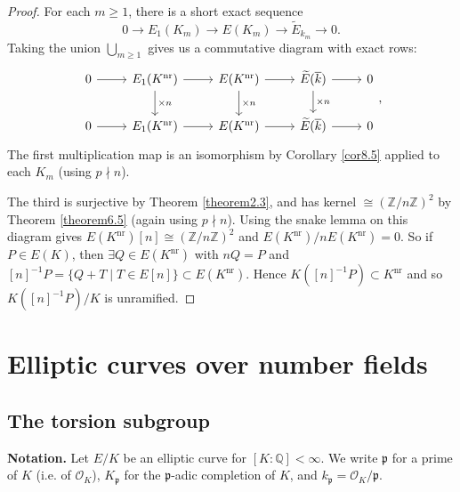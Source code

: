 \documentclass{article}
\theoremstyle{definition}
\begin{document}
\begin{proof}
    For each $m\ge 1$, there is a short exact sequence $$0 \to E_1(K_m) \to E(K_m) \to \widetilde{E}_{k_m} \to 0.$$
    Taking the union $\bigcup_{m\ge 1} $ gives us a commutative diagram with exact rows:
    $$\begin{tikzcd}[]
        0 & E_1(K^{\text{nr}}) & E(K^{\text{nr}}) & \widetilde{E}(\overline{k}) & 0 \\
        0 & E_1(K^{\text{nr}}) & E(K^{\text{nr}}) & \widetilde{E}(\overline{k}) & 0
        \arrow["", from=1-1, to=1-2]
        \arrow["", from=1-2, to=1-3]
        \arrow["", from=1-3, to=1-4]
        \arrow["", from=1-4, to=1-5]
        \arrow["", from=2-1, to=2-2]
        \arrow["", from=2-2, to=2-3]
        \arrow["", from=2-3, to=2-4]
        \arrow["", from=2-4, to=2-5]
        \arrow["\times n", from=1-2, to=2-2]
        \arrow["\times n", from=1-3, to=2-3]
        \arrow["\times n", from=1-4, to=2-4]
    \end{tikzcd},$$
    The first multiplication map is an isomorphism by Corollary \ref{cor8.5} applied to each $K_m$ (using $p \nmid n$). 
    \vspace{1mm}
    
    The third is surjective by Theorem \ref{theorem2.3}, and has kernel $\cong (\mathbb{Z}/n\mathbb{Z})^2$ by Theorem \ref{theorem6.5} (again using $p \nmid n$). Using the snake lemma on this diagram gives $E(K^{\text{nr}})[n] \cong(\mathbb{Z}/n\mathbb{Z})^2$ and $E(K^{\text{nr}})/nE(K^{\text{nr}}) = 0$. So if $P \in E(K)$, then $\exists Q \in E(K^{\text{nr}})$ with $nQ=P$ and $[n]^{-1}P = \{Q+T \mid T \in E[n]\} \subset E(K^{\text{nr}})$. Hence $K([n]^{-1}P) \subset K^{\text{nr}}$ and so $K([n]^{-1}P)/K$ is unramified.
\end{proof}
\section{Elliptic curves over number fields}
\subsection{The torsion subgroup} 
\textbf{Notation.} Let $E/K$ be an elliptic curve for $[K:\mathbb{Q}]<\infty$. We write $\mathfrak{p}$ for a prime of $K$ (i.e. of $\mathcal{O}_K$), $K_{\mathfrak{p}}$ for the $\mathfrak{p}$-adic completion of $K$, and $k_{\mathfrak{p}}=\mathcal{O}_K/\mathfrak{p}$.
\end{document}
